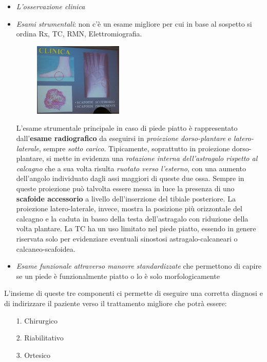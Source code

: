 \begin{itemize}
\item
  \emph{L'osservazione clinica }
\item
  \emph{Esami strumentali}: non c'è un esame migliore per cui in base al sospetto si ordina Rx, TC, RMN, Elettromiografia.
  
\begin{figure}[!ht]
\centering
\includegraphics[width=0.4\textwidth]{014/image6.jpeg}
\end{figure}  

L'esame strumentale principale in caso di piede piatto è rappresentato dall'\textbf{esame radiografico} da eseguirsi in \emph{proiezione dorso-plantare} e \emph{latero-laterale}, sempre \emph{sotto carico}. Tipicamente, soprattutto in proiezione dorso-plantare, si mette in evidenza una \emph{rotazione interna dell'astragalo rispetto al calcagno} che a sua volta risulta \emph{ruotato verso l'esterno}, con una aumento dell'angolo individuato dagli assi maggiori di queste due ossa. Sempre in queste proiezione può talvolta essere messa in luce la presenza di uno \textbf{scafoide accessorio} a livello dell'inserzione del tibiale posteriore. La proiezione latero-laterale, invece, mostra la posizione più orizzontale del calcagno e la caduta in basso della testa dell'astragalo con riduzione della volta plantare. La TC ha un uso limitato nel piede piatto, essendo in genere riservata solo per evidenziare eventuali sinostosi astragalo-calcaneari o calcaneo-scafoidea.
\item
  \emph{Esame funzionale} \emph{attraverso manovre standardizzate} che permettono di capire se un piede è funzionalmente piatto o lo è solo morfologicamente
\end{itemize}

L'insieme di queste tre componenti ci permette di eseguire una corretta diagnosi e di indirizzare il paziente verso il trattamento migliore che potrà essere:

\begin{itemize}
\item[1.]
  Chirurgico
\item[2.]
  Riabilitativo
\item[3.]
  Ortesico
\end{itemize}

